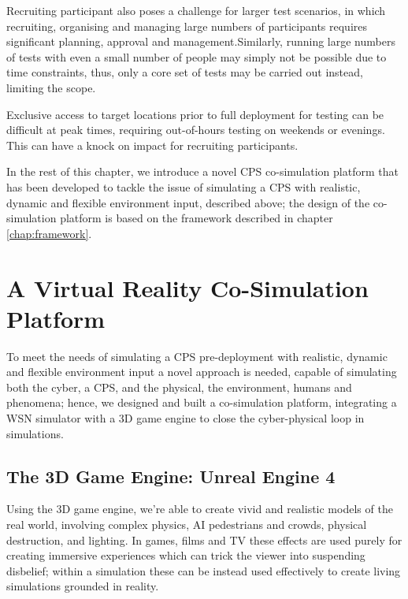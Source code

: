 Recruiting participant also poses a challenge for larger test scenarios, in which recruiting, organising and managing large numbers of participants requires significant planning, approval and management.Similarly, running large numbers of tests with even a small number of people may simply not be possible due to time constraints, thus, only a core set of tests may be carried out instead, limiting the scope.

Exclusive access to target locations prior to full deployment for testing can be difficult at peak times, requiring out-of-hours testing on weekends or evenings. This can have a knock on impact for recruiting participants.


In the rest of this chapter, we introduce a novel CPS co-simulation platform that has been developed to tackle the issue of simulating a CPS with realistic, dynamic and flexible environment input, described above; the design of the co-simulation platform is based on the framework described in chapter \ref{chap:framework}.


\section{A Virtual Reality Co-Simulation Platform} %
\label{sec:a_3d_co_simulation_platform}

To meet the needs of simulating a CPS pre-deployment with realistic, dynamic and flexible environment input a novel approach is needed, capable of simulating both the cyber, a CPS, and the physical, the environment, humans and phenomena; hence, we designed and built a co-simulation platform, integrating a WSN simulator with a 3D game engine to close the cyber-physical loop in simulations. 

\subsection{The 3D Game Engine: Unreal Engine 4} %
\label{sub:a_3d_game_engine}

Using the 3D game engine, we're able to create vivid and realistic models of the real world, involving complex physics, AI pedestrians and crowds, physical destruction, and lighting. In games, films and TV these effects are used purely for creating immersive experiences which can trick the viewer into suspending disbelief; within a simulation these can be instead used effectively to create living simulations grounded in reality. 

